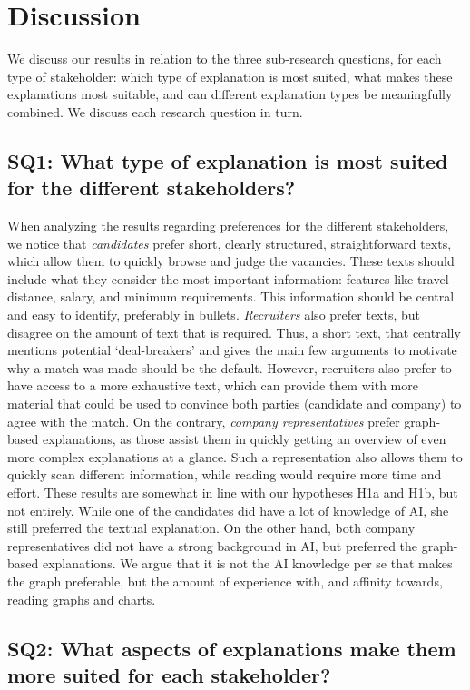 \section{Discussion}
We discuss our results in relation to the three sub-research questions, for each type of stakeholder: which type of explanation is most suited, what makes these explanations most suitable, and can different explanation types be meaningfully combined. We discuss each research question in turn. 

\subsection{SQ1: What type of explanation is most suited for the different stakeholders?}

When analyzing the results regarding preferences for the different stakeholders, we notice that \textit{candidates} prefer short, clearly structured, straightforward texts, which allow them to quickly browse and judge the vacancies. These texts should include what they consider the most important information: features like travel distance, salary, and minimum requirements. This information should be central and easy to identify, preferably in bullets. \textit{Recruiters} also prefer texts, but disagree on the amount of text that is required. Thus, a short text, that centrally mentions potential `deal-breakers' and gives the main few arguments to motivate why a match was made should be the default. However, recruiters also prefer to have access to a more exhaustive text, which can provide them with more material that could be used to convince both parties (candidate and company) to agree with the match. On the contrary, \textit{company representatives} prefer graph-based explanations, as those assist them in quickly getting an overview of even more complex explanations at a glance. Such a representation also allows them to quickly scan different information, while reading would require more time and effort. These results are somewhat in line with our hypotheses H1a and H1b, but not entirely. While one of the candidates did have a lot of knowledge of AI, she still preferred the textual explanation. On the other hand, both company representatives did not have a strong background in AI, but preferred the graph-based explanations. We argue that it is not the AI knowledge per se that makes the graph preferable, but the amount of experience with, and affinity towards, reading graphs and charts.

\subsection{SQ2: What aspects of explanations make them more suited for each stakeholder?}

